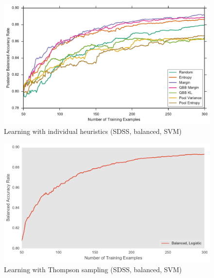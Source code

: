 \begin{figure}[p]
	\centering
	\includegraphics[width=\textwidth]{figures/5_active/sdss_br_individuals}
	\caption[Learning with individual heuristics (SDSS, balanced, SVM)]{
		Learning with individual heuristics (SDSS, balanced, SVM)}
	\label{fig:sdss_br_individuals}
\end{figure}

\begin{figure}[p]
	\centering
	\includegraphics[width=\textwidth]{figures/5_thompson/sdss_br_thompson}
	\caption[Learning with Thompson sampling (SDSS, balanced, SVM)]{
		Learning with Thompson sampling (SDSS, balanced, SVM)}
	\label{fig:sdss_br_thompson}
\end{figure}


